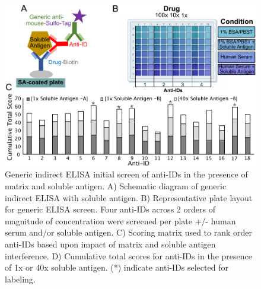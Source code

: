 \begin{figure}[ht]
 \centering
 \includegraphics{graphics/ch3/Figure_1.pdf}
 \caption{Generic indirect ELISA initial screen of anti-IDs in the presence of matrix and soluble antigen. A) Schematic diagram of generic indirect ELISA with soluble antigen. B) Representative plate layout for generic ELISA screen.  Four anti-IDs across 2 orders of magnitude of concentration were screened per plate +/- human serum and/or soluble antigen.  C) Scoring matrix used to rank order anti-IDs based upon impact of matrix and soluble antigen interference.  D) Cumulative total scores for anti-IDs in the presence of 1x or 40x soluble antigen.  (*) indicate anti-IDs selected for labeling.}
 \end{figure}


